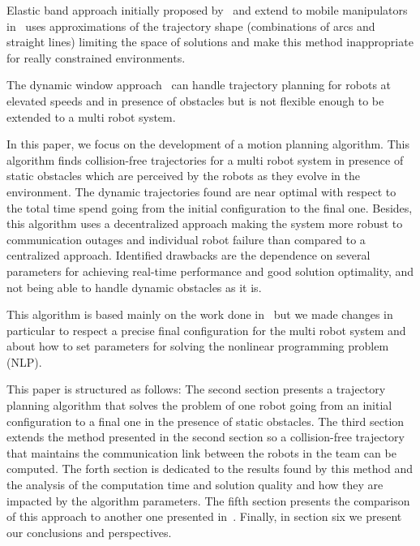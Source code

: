 \documentclass[eprint]{actapoly}
\begin{document}
 

Elastic band approach initially proposed by~\cite{Quinlan1994} and extend to 
mobile manipulators in~\cite{Brock et Khatib, 1998} uses approximations of the 
trajectory shape (combinations of arcs and straight lines) limiting the space 
of solutions and make this method inappropriate for really constrained 
environments.

 

The dynamic window approach~\cite{fox1997dynamic} can handle trajectory 
planning for robots at elevated speeds and in presence of obstacles but is not 
flexible enough to be extended to a multi robot system.

 


In this paper, we focus on the development of a motion planning algorithm. 
This algorithm finds collision-free trajectories for a multi robot system in 
presence of static obstacles which are perceived by the robots as they evolve 
in the environment. The dynamic trajectories found are near optimal with 
respect to the total time spend going from the initial configuration to the 
final one. Besides, this algorithm uses a decentralized approach making the 
system more robust to communication outages and individual robot failure than 
compared to a centralized approach. Identified drawbacks are the dependence on 
several parameters for achieving real-time performance and good solution 
optimality, and not being able to handle dynamic obstacles as it is.

 

This algorithm is based mainly on the work done in~\cite{Defoort2007a} but we 
made changes in particular to respect a precise final configuration for the 
multi robot system and about how to set parameters for solving the nonlinear 
programming problem (NLP).

 


This paper is structured as follows: The second section presents a trajectory 
planning algorithm that solves the problem of one robot going from an initial 
configuration to a final one in the presence of static obstacles. The third 
section extends the method presented in the second section so a collision-free 
trajectory that maintains the communication link between the robots in the 
team can be computed. The forth section is dedicated to the results found by 
this method and the analysis of the computation time and solution quality and 
how they are impacted by the algorithm parameters. The fifth section presents 
the comparison of this approach to another one presented in~\cite{}. Finally, in 
section six we present our conclusions and perspectives.
\end{document}

